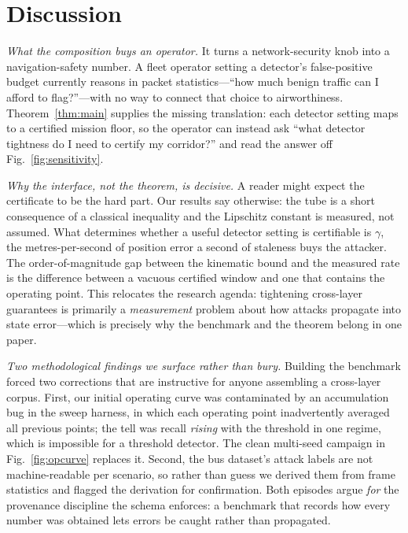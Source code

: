 \section{Discussion}
\label{sec:discussion}
\emph{What the composition buys an operator.} It turns a network-security knob
into a navigation-safety number. A fleet operator setting a detector's
false-positive budget currently reasons in packet statistics---``how much benign
traffic can I afford to flag?''---with no way to connect that choice to
airworthiness. Theorem~\ref{thm:main} supplies the missing translation: each
detector setting maps to a certified mission floor, so the operator can instead
ask ``what detector tightness do I need to certify my corridor?'' and read the
answer off Fig.~\ref{fig:sensitivity}.

\emph{Why the interface, not the theorem, is decisive.} A reader might expect
the certificate to be the hard part. Our results say otherwise: the tube is a
short consequence of a classical inequality and the Lipschitz constant is
measured, not assumed. What determines whether a useful detector setting is
certifiable is $\gamma$, the metres-per-second of position error a second of
staleness buys the attacker. The order-of-magnitude gap between the kinematic
bound and the measured rate is the difference between a vacuous certified window
and one that contains the operating point. This relocates the research agenda:
tightening cross-layer guarantees is primarily a \emph{measurement} problem
about how attacks propagate into state error---which is precisely why the
benchmark and the theorem belong in one paper.

\emph{Two methodological findings we surface rather than bury.} Building the
benchmark forced two corrections that are instructive for anyone assembling a
cross-layer corpus. First, our initial operating curve was contaminated by an
accumulation bug in the sweep harness, in which each operating point
inadvertently averaged all previous points; the tell was recall \emph{rising}
with the threshold in one regime, which is impossible for a threshold detector.
The clean multi-seed campaign in Fig.~\ref{fig:opcurve} replaces it. Second, the
bus dataset's attack labels are not machine-readable per scenario, so rather
than guess we derived them from frame statistics and flagged the derivation for
confirmation. Both episodes argue \emph{for} the provenance discipline the
schema enforces: a benchmark that records how every number was obtained lets
errors be caught rather than propagated.

